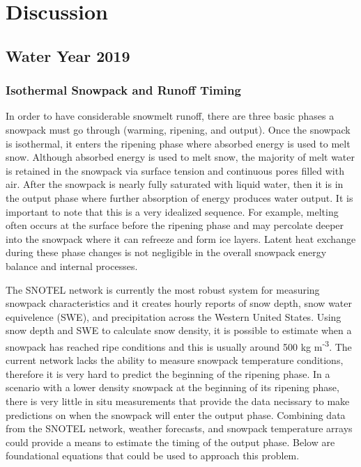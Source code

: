 \chapter{Discussion}
\section{Water Year 2019} 
\subsection{Isothermal Snowpack and Runoff Timing}
In order to have considerable snowmelt runoff, there are three basic phases a snowpack must go through (warming, ripening, and output). Once the snowpack is isothermal, it enters the ripening phase where absorbed energy is used to melt snow. Although absorbed energy is used to melt snow, the majority of melt water is retained in the snowpack via surface tension and continuous pores filled with air. After the snowpack is nearly fully saturated with liquid water, then it is in the output phase where further absorption of energy produces water output. It is important to note that this is a very idealized sequence. For example, melting often occurs at the surface before the ripening phase and may percolate deeper into the snowpack where it can refreeze and form ice layers. Latent heat exchange during these phase changes is not negligible in the overall snowpack energy balance and internal processes. 

The SNOTEL network is currently the most robust system for measuring snowpack characteristics and it creates hourly reports of snow depth, snow water equivelence (SWE), and precipitation across the Western United States. Using snow depth and SWE to calculate snow density, it is possible to estimate when a snowpack has reached ripe conditions and this is usually around 500 kg m\textsuperscript{-3}. The current network lacks the ability to measure snowpack temperature conditions, therefore it is very hard to predict the beginning of the ripening phase. In a scenario with a lower density snowpack at the beginning of its ripening phase, there is very little in situ measurements that provide the data necissary to make predictions on when the snowpack will enter the output phase. Combining data from the SNOTEL network, weather forecasts, and snowpack temperature arrays could provide a means to estimate the timing of the output phase. Below are foundational equations that could be used to approach this problem. 

